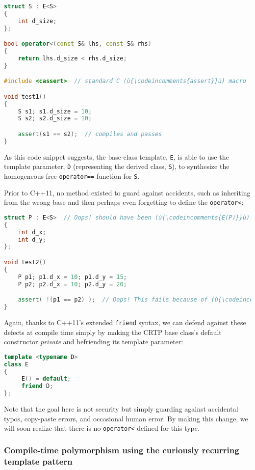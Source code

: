 \begin{lstlisting}[language=C++]
struct S : E<S>
{
    int d_size;
};

bool operator<(const S& lhs, const S& rhs)
{
    return lhs.d_size < rhs.d_size;
}

#include <cassert>  // standard C (ù{\codeincomments{assert}}ù) macro

void test1()
{
    S s1; s1.d_size = 10;
    S s2; s2.d_size = 10;

    assert(s1 == s2);  // compiles and passes
}
\end{lstlisting}

\noindent As this code snippet suggests, the base-class template, \texttt{E}, is
able to use the template parameter, \texttt{D} (representing the derived
class, \texttt{S}), to synthesize the homogeneous free
\texttt{operator==} function for \texttt{S}.

Prior to C++11, no method existed to guard against accidents, such as
inheriting from the wrong base and then perhaps even forgetting to
define the \texttt{operator<}:

\begin{lstlisting}[language=C++]
struct P : E<S>  // Oops! should have been (ù{\codeincomments{E(P)}}ù) -- a serious latent defect
{
    int d_x;
    int d_y;
};

void test2()
{
    P p1; p1.d_x = 10; p1.d_y = 15;
    P p2; p2.d_x = 10; p2.d_y = 20;

    assert( !(p1 == p2) );  // Oops! This fails because of (ù{\codeincomments{E(S)}}ù) above.
}
\end{lstlisting}

\noindent Again, thanks to C++11's extended \texttt{friend} syntax, we can defend
against these defects at compile time simply by making the CRTP base
class's default constructor \emph{private} and befriending its template
parameter:

\begin{lstlisting}[language=C++]
template <typename D>
class E
{
     E() = default;
     friend D;
};
\end{lstlisting}

\noindent Note that the goal here is not security but simply guarding against
accidental typos, copy-paste errors, and occasional  human error. By making this change, we will soon realize that there
is no \texttt{operator<} defined for this type.

\subsubsection[Compile-time polymorphism using the curiously recurring template pattern]{Compile-time polymorphism using the curiously recurring template pattern}\label{compile-time-polymorphism-using-crtp}

